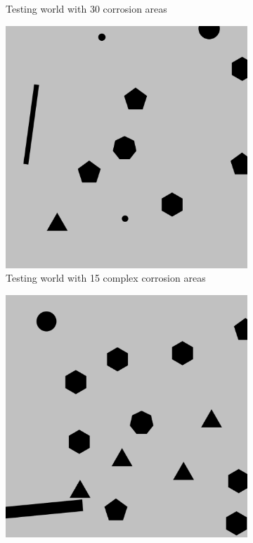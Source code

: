 \documentclass[francais,RandD]{rapportPFE}
\begin{document}
\begin{figure}[h!]
\begin{subfigure}[t]{0.15\linewidth}
				\caption{Testing world with 30 corrosion areas}
				\label{fig:test_model_30_1}
			\end{subfigure}
			\hfill
			\begin{subfigure}[t]{0.15\linewidth}
					\includegraphics[width=\linewidth]{graphics/test_model_11_complex_1.png}
					\caption{Testing world with 15 complex corrosion areas}
					\label{fig:test_model_11_complex_1}
			\end{subfigure}
			\hfill
			\begin{subfigure}[t]{0.15\linewidth}
				\centering
				\includegraphics[width=\linewidth]{graphics/test_model_15_complex_1.png}

\end{subfigure}
\end{figure}
\end{document}
